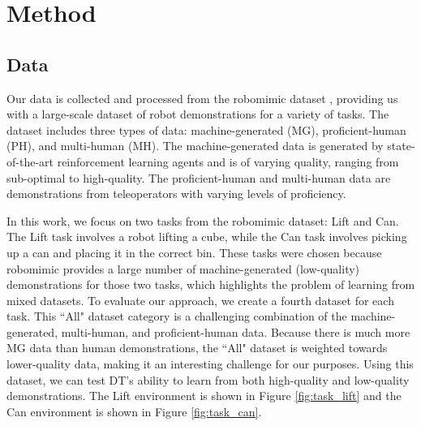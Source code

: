 \section{Method}
\label{sec:method}


\subsection{Data}

Our data is collected and processed from the robomimic dataset \cite{robomimic2021},  providing us with a large-scale dataset of robot demonstrations for a variety of tasks. The dataset includes three types of data: machine-generated (MG), proficient-human (PH), and multi-human (MH). The machine-generated data is generated by state-of-the-art reinforcement learning agents and is of varying quality, ranging from sub-optimal to high-quality. The proficient-human and multi-human data are demonstrations from teleoperators with varying levels of proficiency.

In this work, we focus on two tasks from the robomimic dataset: Lift and Can. The Lift task involves a robot lifting a cube, while the Can task involves picking up a can and placing it in the correct bin. These tasks were chosen because robomimic provides a large number of machine-generated (low-quality) demonstrations for those two tasks, which highlights the problem of learning from mixed datasets. To evaluate our approach, we create a fourth dataset for each task. This ``All" dataset category is a challenging combination of the machine-generated, multi-human, and proficient-human data. Because there is much more MG data than human demonstrations, the ``All" dataset is weighted towards lower-quality data, making it an interesting challenge for our purposes. Using this dataset, we can test DT's ability to learn from both high-quality and low-quality demonstrations. The Lift environment is shown in Figure \ref{fig:task_lift} and the Can environment is shown in Figure \ref{fig:task_can}. 

